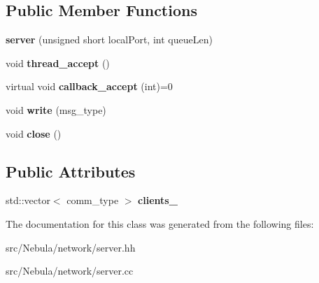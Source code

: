 \subsection*{Public Member Functions}
\begin{DoxyCompactItemize}
\item 
\hypertarget{classgal_1_1network_1_1server_a6a32bfaf00473ece2a662178aff0f94b}{{\bfseries server} (unsigned short local\-Port, int queue\-Len)}\label{classgal_1_1network_1_1server_a6a32bfaf00473ece2a662178aff0f94b}

\item 
\hypertarget{classgal_1_1network_1_1server_a15ed05d13f3c164f019319bbf919461e}{void {\bfseries thread\-\_\-accept} ()}\label{classgal_1_1network_1_1server_a15ed05d13f3c164f019319bbf919461e}

\item 
\hypertarget{classgal_1_1network_1_1server_a559c28e8c77194b40da278d165407d9b}{virtual void {\bfseries callback\-\_\-accept} (int)=0}\label{classgal_1_1network_1_1server_a559c28e8c77194b40da278d165407d9b}

\item 
\hypertarget{classgal_1_1network_1_1server_a2fe739a1f9f309f36560cb451082b67f}{void {\bfseries write} (msg\-\_\-type)}\label{classgal_1_1network_1_1server_a2fe739a1f9f309f36560cb451082b67f}

\item 
\hypertarget{classgal_1_1network_1_1server_a338a20b03a964019c062111791c41873}{void {\bfseries close} ()}\label{classgal_1_1network_1_1server_a338a20b03a964019c062111791c41873}

\end{DoxyCompactItemize}
\subsection*{Public Attributes}
\begin{DoxyCompactItemize}
\item 
\hypertarget{classgal_1_1network_1_1server_a08530e8046e4966c9388fc9f8bcd371f}{std\-::vector$<$ comm\-\_\-type $>$ {\bfseries clients\-\_\-}}\label{classgal_1_1network_1_1server_a08530e8046e4966c9388fc9f8bcd371f}

\end{DoxyCompactItemize}


The documentation for this class was generated from the following files\-:\begin{DoxyCompactItemize}
\item 
src/\-Nebula/network/server.\-hh\item 
src/\-Nebula/network/server.\-cc\end{DoxyCompactItemize}
